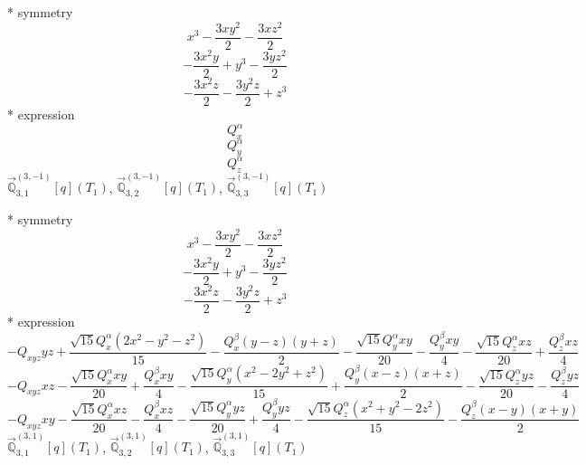 \documentclass[fleqn,8pt]{jsarticle}
\begin{document}
\noindent\quad ** symmetry
\begin{dmath*}
x^{3} - \frac{3 x y^{2}}{2} - \frac{3 x z^{2}}{2}
\end{dmath*}
\begin{dmath*}
- \frac{3 x^{2} y}{2} + y^{3} - \frac{3 y z^{2}}{2}
\end{dmath*}
\begin{dmath*}
- \frac{3 x^{2} z}{2} - \frac{3 y^{2} z}{2} + z^{3}
\end{dmath*}
\noindent\quad ** expression
\begin{dmath*}
Q_{x}^{\alpha}
\end{dmath*}
\begin{dmath*}
Q_{y}^{\alpha}
\end{dmath*}
\begin{dmath*}
Q_{z}^{\alpha}
\end{dmath*}
\noindent\quad $\vec{\mathbb{Q}}_{3,1}^{(3,-1)}[q](T_{1})$, $\vec{\mathbb{Q}}_{3,2}^{(3,-1)}[q](T_{1})$, $\vec{\mathbb{Q}}_{3,3}^{(3,-1)}[q](T_{1})$

\noindent\quad ** symmetry
\begin{dmath*}
x^{3} - \frac{3 x y^{2}}{2} - \frac{3 x z^{2}}{2}
\end{dmath*}
\begin{dmath*}
- \frac{3 x^{2} y}{2} + y^{3} - \frac{3 y z^{2}}{2}
\end{dmath*}
\begin{dmath*}
- \frac{3 x^{2} z}{2} - \frac{3 y^{2} z}{2} + z^{3}
\end{dmath*}
\noindent\quad ** expression
\begin{dmath*}
- Q_{xyz} y z + \frac{\sqrt{15} Q_{x}^{\alpha} \left(2 x^{2} - y^{2} - z^{2}\right)}{15} - \frac{Q_{x}^{\beta} \left(y - z\right) \left(y + z\right)}{2} - \frac{\sqrt{15} Q_{y}^{\alpha} x y}{20} - \frac{Q_{y}^{\beta} x y}{4} - \frac{\sqrt{15} Q_{z}^{\alpha} x z}{20} + \frac{Q_{z}^{\beta} x z}{4}
\end{dmath*}
\begin{dmath*}
- Q_{xyz} x z - \frac{\sqrt{15} Q_{x}^{\alpha} x y}{20} + \frac{Q_{x}^{\beta} x y}{4} - \frac{\sqrt{15} Q_{y}^{\alpha} \left(x^{2} - 2 y^{2} + z^{2}\right)}{15} + \frac{Q_{y}^{\beta} \left(x - z\right) \left(x + z\right)}{2} - \frac{\sqrt{15} Q_{z}^{\alpha} y z}{20} - \frac{Q_{z}^{\beta} y z}{4}
\end{dmath*}
\begin{dmath*}
- Q_{xyz} x y - \frac{\sqrt{15} Q_{x}^{\alpha} x z}{20} - \frac{Q_{x}^{\beta} x z}{4} - \frac{\sqrt{15} Q_{y}^{\alpha} y z}{20} + \frac{Q_{y}^{\beta} y z}{4} - \frac{\sqrt{15} Q_{z}^{\alpha} \left(x^{2} + y^{2} - 2 z^{2}\right)}{15} - \frac{Q_{z}^{\beta} \left(x - y\right) \left(x + y\right)}{2}
\end{dmath*}
\noindent\quad $\vec{\mathbb{Q}}_{3,1}^{(3,1)}[q](T_{1})$, $\vec{\mathbb{Q}}_{3,2}^{(3,1)}[q](T_{1})$, $\vec{\mathbb{Q}}_{3,3}^{(3,1)}[q](T_{1})$
\end{document}
